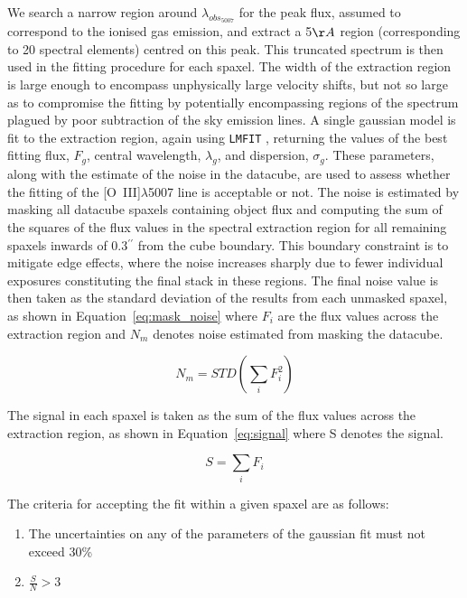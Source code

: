 \documentclass[fleqn,usenatbib]{mn2e}
\begin{document}
We search a narrow region around $\lambda_{obs_{5007}}$ for the peak flux, assumed to correspond to the ionised gas emission, and extract a 5$\AA$ region (corresponding to 20 spectral elements) centred on this peak.
This truncated spectrum is then used in the fitting procedure for each spaxel.
The width of the extraction region is large enough to encompass unphysically large velocity shifts, but not so large as to compromise the fitting by potentially encompassing regions of the spectrum plagued by poor subtraction of the sky emission lines.
A single gaussian model is fit to the extraction region, again using {\tt LMFIT} \citep{Newville2014}, returning the values of the best fitting flux, $F_{g}$, central wavelength, $\lambda_{g}$, and dispersion, $\sigma_{g}$.
These parameters, along with the estimate of the noise in the datacube, are used to assess whether the fitting of the [O~{\sc III}]$\lambda$5007 line is acceptable or not. 
The noise is estimated by masking all datacube spaxels containing object flux and computing the sum of the squares of the flux values in the spectral extraction region for all remaining spaxels inwards of 0.3$^{\prime\prime}$ from the cube boundary.
This boundary constraint is to mitigate edge effects, where the noise increases sharply due to fewer individual exposures constituting the final stack in these regions.
The final noise value is then taken as the standard deviation of the results from each unmasked spaxel, as shown in Equation~\ref{eq:mask_noise} where $F_{i}$ are the flux values across the extraction region and $N_{m}$ denotes noise estimated from masking the datacube.

\begin{equation}\label{eq:noise}
    N_{m} = STD\left(\sum_{i}F_{i}^{2}\right)
\end{equation}

The signal in each spaxel is taken as the sum of the flux values across the extraction region, as shown in Equation~\ref{eq:signal} where S denotes the signal.

\begin{equation}\label{eq:signal}
    S = \sum_{i}F_{i}
\end{equation}

The criteria for accepting the fit within a given spaxel are as follows:

\begin{enumerate}
\item The uncertainties on any of the parameters of the gaussian fit must not exceed 30\%
\item $\frac{S}{N} > 3$
\end{enumerate}
\end{document}
